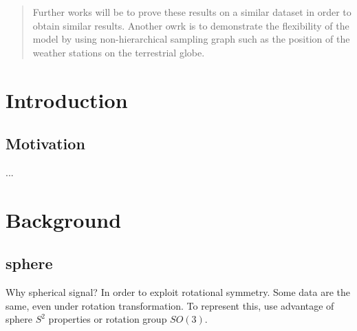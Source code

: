 \documentclass[11pt]{report}
\begin{document}
\begin{abstract}
Further works will be to prove these results on a similar dataset in order to obtain similar results. Another owrk is to demonstrate the flexibility of the model by using non-hierarchical sampling graph such as the position of the weather stations on the terrestrial globe.
\end{abstract}
\chapter{Introduction}
\section{Motivation}
...

\chapter{Background}
\section{sphere}


Why spherical signal? In order to exploit rotational symmetry. Some data are the same, even under rotation transformation. To represent this, use advantage of sphere $S^2$ properties or rotation group $SO(3)$.
\end{document}
